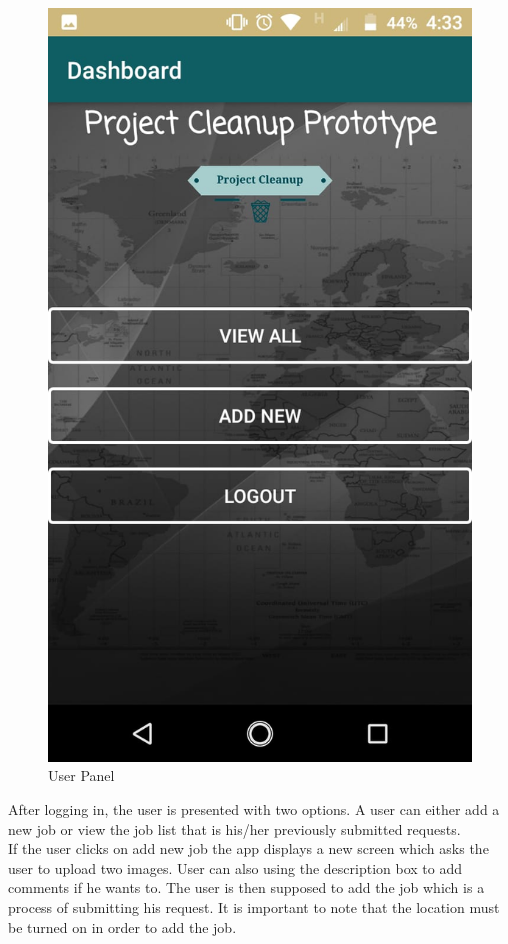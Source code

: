 \begin{figure}[!hb]
   \includegraphics[scale=0.2]{images/3.png}
   
 
   \caption{User Panel}\label{fig:picture}
\end{figure}
After logging in, the user is presented with two options. A user can either add a new job or view the job list that is his/her previously submitted requests.\\
If the user clicks on add new job the app displays a new screen which asks the user to upload two images. User can also using the description box to add comments if he wants to. The user is then supposed to add the job which is a process of submitting his request. It is important to note that the location must be turned on in order to add the job.\\
